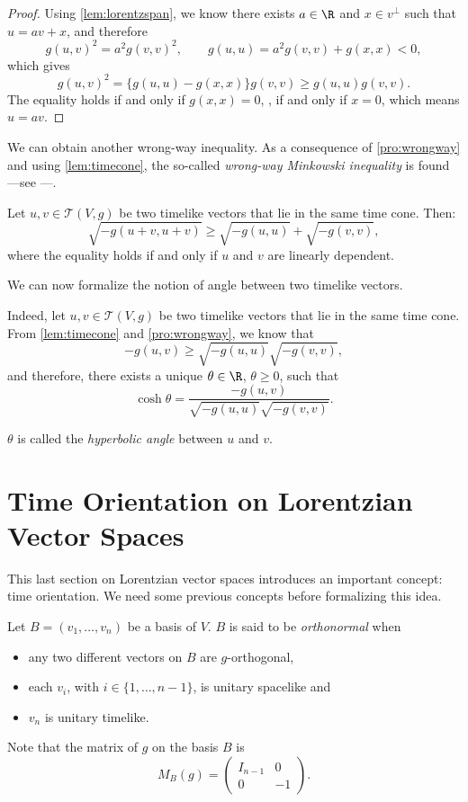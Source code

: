 \begin{proof}
    Using \autoref{lem:lorentzspan}, we know there exists $a \in \R$ and $x \in v^\perp$ such that $u=av+x$, and therefore
    \[
        g(u,v)^2=a^2g(v,v)^2, \quad \quad g(u,u)=a^2g(v,v)+g(x,x)<0,
    \]
    which gives
    \[
        g(u,v)^2=\{g(u,u)-g(x,x)\}g(v,v) \geq g(u,u)g(v,v).
    \]
    The equality holds if and only if $g(x,x)=0$, \ie, if and only if $x=0$, which means $u=av$.
\end{proof}


We can obtain another wrong-way inequality. As a consequence of \autoref{pro:wrongway} and using \autoref{lem:timecone}, the so-called \emph{wrong-way Minkowski inequality} is found ---see \cite[Cor. 5.31]{oneill83}---.

\begin{corollary}
	\label{Minkowski}
    Let $u,v \in \mathcal{T}(V,g)$ be two timelike vectors that lie in the same time cone. Then:
    \[
        \sqrt{-g(u+v,u+v)} \geq \sqrt{-g(u,u)}+\sqrt{-g(v,v)},
    \]
    where the equality holds if and only if $u$ and $v$ are linearly dependent.
\end{corollary}

We can now formalize the notion of angle between two timelike vectors.

Indeed, let $u, v \in \mathcal{T}(V,g)$ be two timelike vectors that lie in the same time cone. From \autoref{lem:timecone} and \autoref{pro:wrongway}, we know that
\[
-g(u,v) \geq \sqrt{-g(u,u)}\sqrt{-g(v,v)},
\]
and therefore, there exists a unique $\theta \in \R$, $\theta \geq 0$, such that
\[
\cosh \theta =\frac{-g(u,v)}{\sqrt{-g(u,u)}\sqrt{-g(v,v)}}.
\]

$\theta$ is called the \emph{hyperbolic angle} between $u$ and $v$.

\section{Time Orientation on Lorentzian Vector Spaces}

This last section on Lorentzian vector spaces introduces an important concept: time orientation. We need some previous concepts before formalizing this idea.

\begin{definition}
	Let $B = (v_1, \dots, v_n)$ be a basis of $V$. $B$ is said to be \emph{orthonormal} when
	\begin{itemize}
		\item any two different vectors on $B$ are $g$-orthogonal,
		\item each $v_i$, with $i \in \{1,\dots,n-1\}$, is unitary spacelike and
		\item $v_n$ is unitary timelike.
	\end{itemize}

	Note that the matrix of $g$ on the basis $B$ is
	\[
		M_B(g) = \begin{pmatrix}
			I_{n-1} & 0  \\
			0 & -1
		\end{pmatrix}.
	\]
\end{definition}

